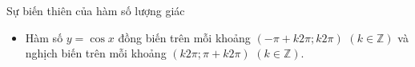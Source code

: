\begin{dang}{Sự biến thiên của hàm số lượng giác}
\begin{itemize}
	\item Hàm số $y = \cos x$ đồng biến trên mỗi khoảng $\left(-\pi+k2\pi; k2\pi\right)$ $(k \in \mathbb{Z})$ và nghịch biến trên mỗi khoảng $\left(k2\pi;\pi+k2\pi\right)$ $(k \in \mathbb{Z})$.\\
	

\end{itemize}
\end{dang}

